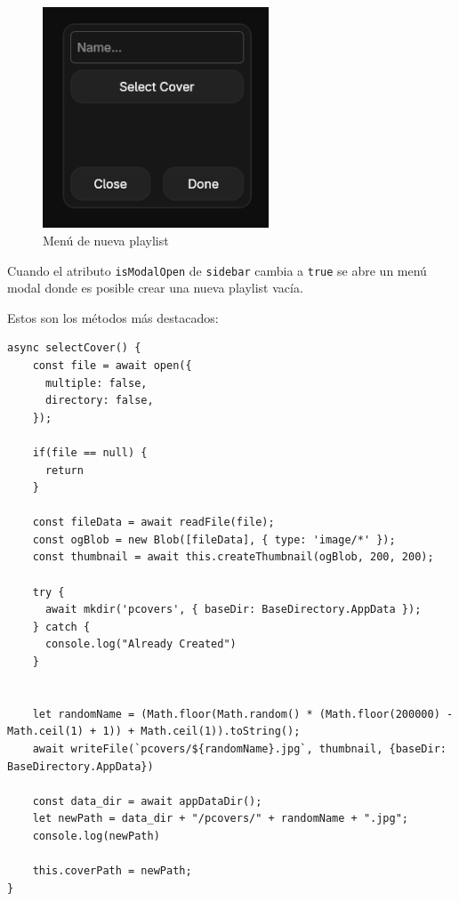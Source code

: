 \documentclass[11pt, a4paper]{article}
\begin{document}
                \begin{figure}[H]
                    \centering
                    \includegraphics[width=0.6\textwidth]{media/screenshots/new_playlist.png}
                    \caption{Menú de nueva playlist}
                    \label{fig:nueva playlist}
                \end{figure}

                Cuando el atributo \texttt{isModalOpen} de \texttt{sidebar} cambia a \texttt{true} se abre un menú modal donde es posible crear una nueva playlist vacía.

                Estos son los métodos más destacados:

                \begin{lstlisting}[caption={selectCover()}]
async selectCover() {
    const file = await open({
      multiple: false,
      directory: false,
    });

    if(file == null) {
      return
    }

    const fileData = await readFile(file);
    const ogBlob = new Blob([fileData], { type: 'image/*' });
    const thumbnail = await this.createThumbnail(ogBlob, 200, 200);

    try {
      await mkdir('pcovers', { baseDir: BaseDirectory.AppData });
    } catch {
      console.log("Already Created")
    }
    

    let randomName = (Math.floor(Math.random() * (Math.floor(200000) - Math.ceil(1) + 1)) + Math.ceil(1)).toString();
    await writeFile(`pcovers/${randomName}.jpg`, thumbnail, {baseDir: BaseDirectory.AppData})

    const data_dir = await appDataDir();
    let newPath = data_dir + "/pcovers/" + randomName + ".jpg";
    console.log(newPath)

    this.coverPath = newPath;
}
                \end{lstlisting}
\end{document}
